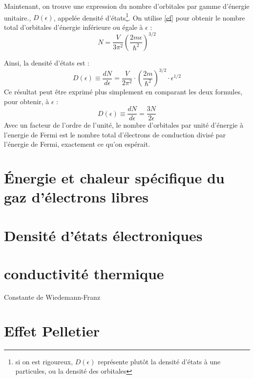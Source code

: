 Maintenant, on trouve une expression du nombre d'orbitales par gamme d'énergie
unitaire., $D(\epsilon)$, appelée densité d'états\footnote{si on est rigoureux,
$D(\epsilon)$ représente plutôt la densité d'états à une particules, ou la
densité des orbitales}. On utilise \ref{ef} pour obtenir le nombre total
d'orbitales d'énergie inférieure ou égale à $\epsilon$ :
\begin{equation}
    N = \frac{V}{3\pi^2} \left(\frac{2m\epsilon}{\hbar^2}\right)^{3/2}
\end{equation}

Ainsi, la densité d'états est :
\begin{equation}
    D(\epsilon) \equiv \frac{dN}{d\epsilon} = 
    \frac{V}{2\pi^2} \cdot 
    \left(\frac{2m}{\hbar^2}\right)^{3/2}\cdot\epsilon^{1/2}
\end{equation}
Ce résultat peut être exprimé plus simplement en comparant les deux formules,
pour obtenir, à $\epsilon$ :
\begin{equation}
    D(\epsilon) \equiv \frac{dN}{d\epsilon} = \frac{3N}{2\epsilon}
\end{equation}
Avec un facteur de l'ordre de l'unité, le nombre d'orbitales par unité d'énergie
à l'energie de Fermi est le nombre total d'électrons de conduction divisé par
l'énergie de Fermi, exactement ce qu'on espérait.

\section{Énergie et chaleur spécifique du gaz d'électrons libres}

\section{Densité d'états électroniques}

\section{conductivité thermique}

Constante de Wiedemann-Franz

\section{Effet Pelletier}
